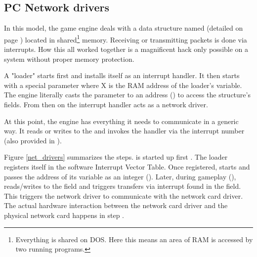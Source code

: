 




\subsection{PC Network drivers}
In this model, the game engine deals with a data structure named  (detailed on page \pageref{doomcom_t.c}) located in shared\footnote{Everything is shared on DOS. Here this means an area of RAM is accessed by two running programs.} memory. Receiving or transmitting packets is done via interrupts. How this all worked together is a magnificent hack only possible on a system without proper memory protection.\\
\par
A "loader" starts first and installs itself as an interrupt handler. It then starts  with a special parameter  where X is the RAM address of the loader's  variable. The engine literally casts the parameter to an address () to access the structure's fields. From then on the interrupt handler acts as a network driver.\\
\par

\par
 At this point, the engine has everything it needs to communicate in a generic way. It reads or writes to the  and invokes the handler via the interrupt number (also provided in ).\\
\par
{}
\par
\vspace{-10pt}
 Figure \ref{net_drivers} summarizes the steps.  is started up first . The loader registers itself in the software Interrupt Vector Table. Once registered,  starts  and passes the address of its  variable as an integer (). Later, during gameplay (),  reads/writes to the   field and triggers transfers via interrupt found in the  field. This triggers  the \doom{} network driver to communicate with the network card driver. The actual hardware interaction between the network card driver and the physical network card happens in step .




